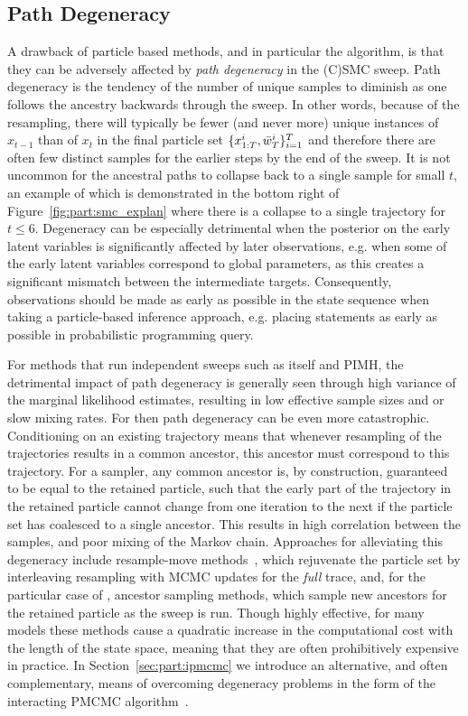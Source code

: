 \subsection{Path Degeneracy}
\label{sec:part:pmcmc:path-deg}

A drawback of particle based methods, and in particular the \pg algorithm, is that they can be adversely 
affected by \emph{path degeneracy} in the (C)SMC sweep.  Path degeneracy is the tendency of the number
of unique samples to diminish as one follows the ancestry backwards through the sweep.  In other words, because
of the resampling, there will typically be fewer (and never more) unique instances of $x_{t-1}$ than of $x_t$
in the final particle set $\{x_{1:T}^i,\bar w_{T}^i\}_{i=1}^T$ and therefore there are often few distinct samples
for the earlier steps by the end of the sweep.  It is not uncommon for the ancestral paths to collapse back to a single sample for
small $t$, an example of which is demonstrated in the bottom right of Figure~\ref{fig:part:smc_explan}
where there is a collapse to a single trajectory for $t\le6$.
Degeneracy can be especially detrimental when the posterior on the early latent variables is significantly
affected by later observations, e.g. when some of the early latent variables correspond to global parameters,
as this creates a significant mismatch between the intermediate targets.  Consequently, observations should
be made as early as possible in the state sequence when taking a particle-based inference approach, e.g.
placing \observe statements as early as possible in probabilistic programming query.

For methods that run independent \smc sweeps such as \smc itself and PIMH, the detrimental impact
of path degeneracy is generally seen through high variance of the marginal likelihood estimates,  resulting
in  low effective sample sizes and or slow mixing rates.  For \pg then path degeneracy can be even
more catastrophic.  Conditioning on an existing trajectory means 
that whenever resampling of the trajectories results in a common ancestor, this ancestor must correspond 
to this trajectory.  For a \pg sampler, any common ancestor is, by construction, guaranteed to be equal 
to the retained particle, such that the early part of the trajectory in the retained particle cannot
change from one iteration to the next if the particle set has coalesced to a single ancestor.
This results in high correlation between the samples, and poor mixing of the Markov chain.
Approaches for alleviating this degeneracy include resample-move methods~\citep{chopin2013smc2},
which rejuvenate the particle set by interleaving resampling with MCMC updates for the \emph{full} trace,
and, for the particular case of \pg, ancestor sampling \citep{lindstenJS2014} methods, 
which sample new ancestors for the retained particle as the 
\csmc sweep is run.  Though highly effective, for many models these methods cause a quadratic increase
in the computational cost with the length of the state space, meaning that they are often prohibitively expensive
in practice.  In Section~\ref{sec:part:ipmcmc} we introduce an alternative, and often complementary, 
means of overcoming degeneracy
problems in the form of the interacting PMCMC algorithm~\citep{rainforth2016interacting}.


